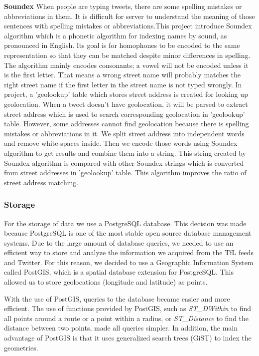 \textbf{Soundex}
When people are typing tweets, there are some spelling mistakes or abbreviations in them. It is difficult for server to understand the meaning of those sentences with spelling mistakes or abbreviations.This project introduce Soundex algorithm which is a phonetic algorithm for indexing names by sound, as pronounced in English. Its goal is for homophones to be encoded to the same representation so that they can be matched despite minor differences in spelling. The algorithm mainly encodes consonants; a vowel will not be encoded unless it is the first letter. That means a wrong street name will probably matches the right street name if the first letter in the street name is not typed wrongly.
In project, a 'geolookup' table which stores street address is created for looking up geolocation. When a tweet doesn't have geolocation, it will be parsed to extract street address which is used to search corresponding geolocation in 'geolookup' table. However, some addresses cannot find geolocation because there is spelling mistakes or abbreviations in it. We split street address into independent words and remove white-spaces inside. Then we encode those words using Soundex algorithm to get results and combine them into a string. This string created by Soundex algorithm is compared with other Soundex strings which is converted from street addresses in 'geolookup' table. This algorithm improves the ratio of street address matching.



\subsubsection{Storage}
For the storage of data we use a PostgreSQL database. This decision was made because PostgreSQL is one of the most stable open source database management systems. Due to the large amount of database queries, we needed to use an efficient way to store and analyze the information we acquired from the TfL feeds and Twitter. For this reason, we decided to use a Geographic Information System called PostGIS, which is a spatial database extension for PostgreSQL. This allowed us to store geolocations (longitude and latitude) as points.

With the use of PostGIS, queries to the database became easier and more efficient. The use of functions provided by PostGIS, such as \emph{ST\_DWithin} to find all points around a route or a point within a radius, or \emph{ST\_Distance} to find the distance between two points, made all queries simpler. In addition, the main advantage of PostGIS is that it uses generalized search trees (GiST) to index the geometries. 

